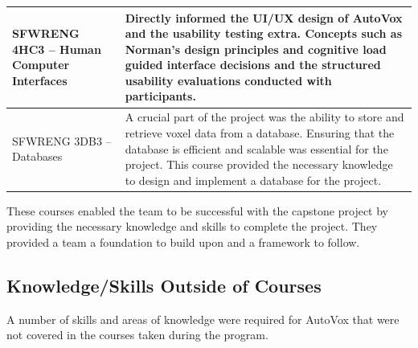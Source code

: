 \documentclass[12pt, titlepage]{article}
\begin{document}
\begin{longtable}{|p{4cm}|p{10cm}|}
SFWRENG 4HC3 -- Human Computer Interfaces &
Directly informed the UI/UX design of AutoVox and the usability testing extra. Concepts such as Norman's design principles and cognitive load guided interface decisions and the structured usability evaluations conducted with participants. \\ \hline

SFWRENG 3DB3 -- Databases &
A crucial part of the project was the ability to store and retrieve voxel data from a database. Ensuring that the database is efficient and scalable was essential for the project. This course provided the necessary knowledge to design and implement a database for the project. \\ \hline

\end{longtable}

These courses enabled the team to be successful with the capstone project by providing the necessary knowledge and skills to complete the project. They provided a team a foundation to build upon and a framework to follow.

\subsection{Knowledge/Skills Outside of Courses}

A number of skills and areas of knowledge were required for AutoVox that were not covered in the courses taken during the program.
\end{document}

